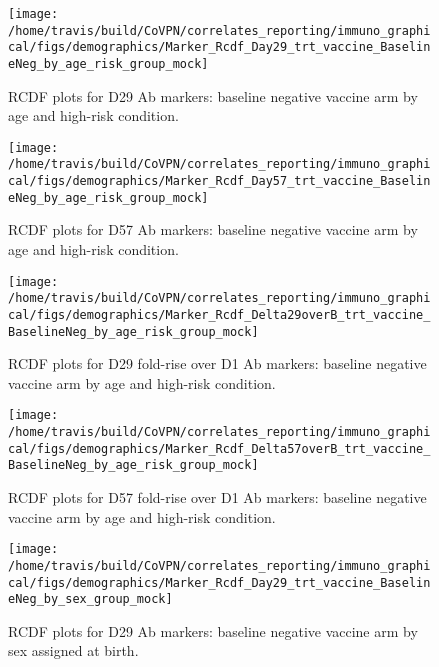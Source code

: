 \documentclass[]{book}
\theoremstyle{definition}
\theoremstyle{definition}
\theoremstyle{definition}
\newcommand{\1}{\mathbbm{1}}
\begin{document}
\clearpage
\begin{figure}[H]

{\centering \texttt{[image: /home/travis/build/CoVPN/correlates\_reporting/immuno\_graphical/figs/demographics/Marker\_Rcdf\_Day29\_trt\_vaccine\_BaselineNeg\_by\_age\_risk\_group\_mock]} 

}

\caption{RCDF plots for D29 Ab markers: baseline negative vaccine arm by age and high-risk condition.}\label{fig:unnamed-chunk-63}
\end{figure}

\clearpage
\begin{figure}[H]

{\centering \texttt{[image: /home/travis/build/CoVPN/correlates\_reporting/immuno\_graphical/figs/demographics/Marker\_Rcdf\_Day57\_trt\_vaccine\_BaselineNeg\_by\_age\_risk\_group\_mock]} 

}

\caption{RCDF plots for D57 Ab markers: baseline negative vaccine arm by age and high-risk condition.}\label{fig:unnamed-chunk-64}
\end{figure}

\clearpage
\begin{figure}[H]

{\centering \texttt{[image: /home/travis/build/CoVPN/correlates\_reporting/immuno\_graphical/figs/demographics/Marker\_Rcdf\_Delta29overB\_trt\_vaccine\_BaselineNeg\_by\_age\_risk\_group\_mock]} 

}

\caption{RCDF plots for D29 fold-rise over D1 Ab markers: baseline negative vaccine arm by age and high-risk condition.}\label{fig:unnamed-chunk-65}
\end{figure}

\clearpage
\begin{figure}[H]

{\centering \texttt{[image: /home/travis/build/CoVPN/correlates\_reporting/immuno\_graphical/figs/demographics/Marker\_Rcdf\_Delta57overB\_trt\_vaccine\_BaselineNeg\_by\_age\_risk\_group\_mock]} 

}

\caption{RCDF plots for D57 fold-rise over D1 Ab markers: baseline negative vaccine arm by age and high-risk condition.}\label{fig:unnamed-chunk-66}
\end{figure}

\clearpage
\begin{figure}[H]

{\centering \texttt{[image: /home/travis/build/CoVPN/correlates\_reporting/immuno\_graphical/figs/demographics/Marker\_Rcdf\_Day29\_trt\_vaccine\_BaselineNeg\_by\_sex\_group\_mock]} 

}

\caption{RCDF plots for D29 Ab markers: baseline negative vaccine arm by sex assigned at birth.}\label{fig:unnamed-chunk-67}
\end{figure}
\end{document}
